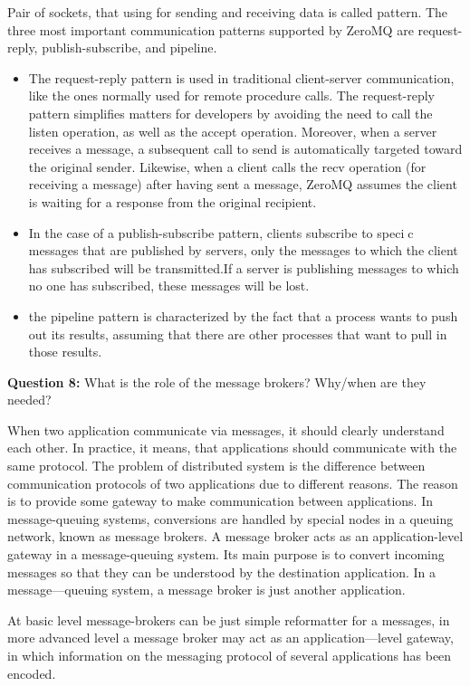 \documentclass[12pt,a4paper]{report}
\begin{document}
Pair of sockets, that using for sending and receiving data is called pattern. The three most important communication patterns supported by ZeroMQ are request-reply, publish-subscribe, and pipeline.
\begin{itemize}
	\item{The request-reply pattern is used in traditional client-server communication, like the ones normally used for remote procedure calls. The request-reply pattern simplifies matters for developers by avoiding the need to call the listen operation, as well as the accept operation. Moreover, when a server receives a message, a subsequent call to send is automatically targeted toward the original sender. Likewise, when a client calls the recv operation (for receiving a message) after having sent a message, ZeroMQ  assumes the client is waiting for a response from the original recipient.}
	\item{In the case of a publish-subscribe pattern, clients subscribe to specic messages that are published by servers, only the messages to which the client has subscribed will be transmitted.If a server is publishing messages to which no one has subscribed, these messages will be lost.}
	\item{the pipeline pattern is characterized by the fact that a process wants to push out its results, assuming that there are other processes that want to pull in those results.}
\end{itemize}

\bigbreak

\textbf{Question 8:} What is the role of the message brokers? Why/when are they needed?

When two application communicate via messages, it should clearly understand each other. In practice, it means, that applications should communicate with the same protocol. The problem of distributed system is the difference between communication protocols of two applications due to different reasons. The reason is to provide some gateway to make communication between applications. In message-queuing systems, conversions are handled by special nodes in a queuing network, known as message brokers. A message broker acts as an application-level gateway in a message-queuing system. Its main purpose is to convert incoming messages so that they can be understood by the destination application. In a message—queuing system, a message broker is just another application.

At basic level message-brokers can be just simple reformatter for a messages, in more advanced level a message broker may act as an application—level gateway, in which information on the messaging protocol of several applications has been encoded.
\end{document}
